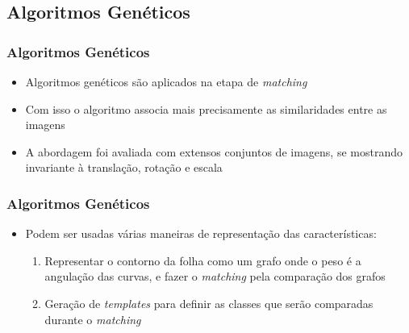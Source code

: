 \documentclass[brazil,a4paper,12pt]{beamer}%
\begin{document}
   \subsection{Algoritmos Genéticos}
     \begin{frame}
      \frametitle{Algoritmos Genéticos}
	\begin{itemize}
	 \item{Algoritmos genéticos são aplicados na etapa de \textit{matching}}
	 \item{Com isso o algoritmo associa mais precisamente as similaridades entre as imagens}
	 \item{A abordagem foi avaliada com extensos conjuntos de imagens, se mostrando invariante à translação, rotação e escala} 
	\end{itemize}
     \end{frame}
     \begin{frame}
      \frametitle{Algoritmos Genéticos}
      \begin{itemize}
       \item{Podem ser usadas várias maneiras de representação das características:
	  \begin{enumerate}
	    \item{Representar o contorno da folha como um grafo onde o peso é a angulação das curvas, e fazer o \textit{matching} pela comparação dos grafos}
	    \item{Geração de \textit{templates} para definir as classes que serão comparadas durante o \textit{matching}}
	  \end{enumerate}
	 }
      \end{itemize}
     \end{frame}

    
\end{document}
